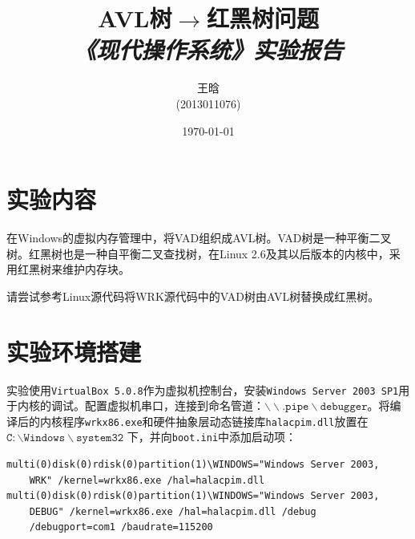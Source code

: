 \documentclass[a4paper, 11pt]{article}
\newcommand{\xiaosihao}{\fontsize{12pt}{\baselineskip}\selectfont}
\begin{document}
\newtheorem{example}{例}             %
\newtheorem{algorithm}{算法}
\newtheorem{theorem}{定理}[section]  %
\newtheorem{definition}{定义}
\newtheorem{axiom}{公理}
\newtheorem{property}{性质}
\newtheorem{proposition}{命题}
\newtheorem{lemma}{引理}
\newtheorem{corollary}{推论}
\newtheorem{remark}{注解}
\newtheorem{condition}{条件}
\newtheorem{conclusion}{结论}
\newtheorem{assumption}{假设}
\newtheorem{problem}{问题}
\renewcommand{\contentsname}{目录}  %
\renewcommand{\abstractname}{摘要}  %
\renewcommand{\refname}{参考文献}   %
\renewcommand{\indexname}{索引}
\renewcommand{\figurename}{图}
\renewcommand{\tablename}{表}
\renewcommand{\appendixname}{附录}

    \title{\textbf{AVL树$\rightarrow$红黑树问题}\\\xiaosihao \emph{《现代操作系统》实验报告}}
    \author{王晗\\(2013011076)}
    \date{\today}
    \maketitle

    \section{实验内容}
        在Windows的虚拟内存管理中，将VAD组织成AVL树。VAD树是一种平衡二叉树。红黑树也是一种自平衡二叉查找树，在Linux 2.6及其以后版本的内核中，采用红黑树来维护内存块。

        请尝试参考Linux源代码将WRK源代码中的VAD树由AVL树替换成红黑树。

    \section{实验环境搭建}
        实验使用\texttt{VirtualBox 5.0.8}作为虚拟机控制台，安装\texttt{Windows Server 2003 SP1}用于内核的调试。配置虚拟机串口，连接到命名管道：$\mathtt{\backslash\backslash.pipe\backslash debugger}$。将编译后的内核程序\texttt{wrkx86.exe}和硬件抽象层动态链接库\texttt{halacpim.dll}放置在$\mathtt{C:\backslash Windows\backslash system32}$ 下，并向\texttt{boot.ini}中添加启动项：
\begin{lstlisting}
multi(0)disk(0)rdisk(0)partition(1)\WINDOWS="Windows Server 2003, 
    WRK" /kernel=wrkx86.exe /hal=halacpim.dll
multi(0)disk(0)rdisk(0)partition(1)\WINDOWS="Windows Server 2003, 
    DEBUG" /kernel=wrkx86.exe /hal=halacpim.dll /debug
    /debugport=com1 /baudrate=115200
\end{lstlisting}
        
\end{document}
